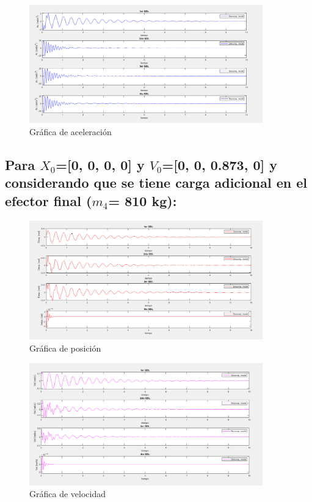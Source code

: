 \documentclass{aleph-revista}
\begin{document}
\begin{figure}[H]
    \centering
    \includegraphics[width=0.90\textwidth]{Imagenes/r21.png}
    \caption{Gráfica de aceleración}
    \label{fig:etiqueta de la figura}
\end{figure}


\subsection{Para $X_0$=[0, 0, 0, 0] y $V_0$=[0, 0, 0.873, 0] y considerando que se tiene carga adicional en el efector final ($m_4$= 810 kg):}
\begin{figure}[H]
    \centering
    \includegraphics[width=0.90\textwidth]{Imagenes/r22.png}
    \caption{Gráfica de posición}
    \label{fig:etiqueta de la figura}
\end{figure}

\begin{figure}[H]
    \centering
    \includegraphics[width=0.90\textwidth]{Imagenes/r23.png}
    \caption{Gráfica de velocidad}
    \label{fig:etiqueta de la figura}
\end{figure}
\end{document}
